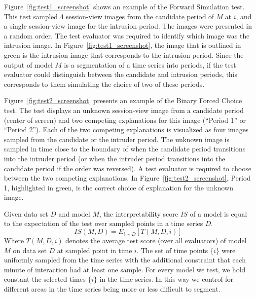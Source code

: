\documentclass[letterpaper]{article} %
\newcommand{\kibitz}[2]{\ifnum\Comments=1{\textcolor{#1}{#2}}\fi}
\newcommand{\nh}[1]{\kibitz{blue}{[NH:#1]}}
\begin{document}
Figure~\ref{fig:test1_screenshot} shows an example of the Forward Simulation test.
This test sampled 4 session-view images from the candidate period of $M$ at $i$, and a single session-view image for the intrusion period.
The images were presented in a random order.
The test evaluator was required to identify which image was the intrusion image.
In Figure~\ref{fig:test1_screenshot}, the image that is outlined in green is the intrusion image that corresponds to the intrusion period.
Since the output of model $M$ is a segmentation of a time series into periods, if the test evaluator could distinguish between the candidate and intrusion periods, this corresponds to them simulating the choice of two of these periods.


Figure~\ref{fig:test2_screenshot} presents an example of the Binary Forced Choice test.
The test displays an unknown session-view image from a candidate period (center of screen) and two competing explanations for this image (``Period 1'' or ``Period 2'').
Each of the  two competing explanations is visualized as four images sampled from the candidate or the intruder period.
The unknown image is sampled in time close to the boundary of when the candidate period transitions into the intruder period (or when the intruder period transitions into the candidate period if the order was reversed).
A test evaluator is required to choose between the two competing explanations.
In Figure~\ref{fig:test2_screenshot}, Period 1, highlighted in green, is the correct choice of explanation for the unknown image.


Given data set $D$ and model $M$, the interpretability score $IS$ of a model is equal to the expectation   of the test over sampled points in a time series $D$.
\begin{equation}
    \label{eq:interpretability_score_eq}
     IS(M,D) = E_{i\sim D} [ T (M,D,i)]
\end{equation}
Where $T(M,D,i)$  denotes the average test score (over all evaluators) of model $M$ on data set $D$ at sampled point in time $i$. The set of time points $\{i\}$ were uniformly sampled from the time series with the additional constraint that each minute of interaction had at least one sample.
For every model we test, we hold constant the selected times $\{i\}$ in the time series. In this way we  control for different areas in the time series being more or less difficult to segment.
\end{document}
